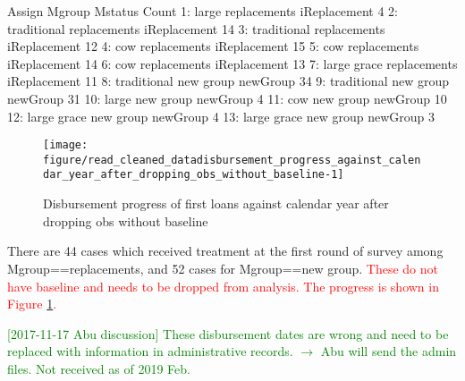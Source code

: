\begin{Schunk}
\begin{Soutput}
         Assign       Mgroup      Mstatus Count
 1:       large replacements iReplacement     4
 2: traditional replacements iReplacement    14
 3: traditional replacements iReplacement    12
 4:         cow replacements iReplacement    15
 5:         cow replacements iReplacement    14
 6:         cow replacements iReplacement    13
 7: large grace replacements iReplacement    11
 8: traditional    new group     newGroup    34
 9: traditional    new group     newGroup    31
10:       large    new group     newGroup     4
11:         cow    new group     newGroup    10
12: large grace    new group     newGroup     4
13: large grace    new group     newGroup     3
\end{Soutput}
\begin{figure}

{\centering \texttt{[image: figure/read\_cleaned\_datadisbursement\_progress\_against\_calendar\_year\_after\_dropping\_obs\_without\_baseline-1]} 

}

\caption[Disbursement progress of first loans against calendar year after dropping obs without baseline]{Disbursement progress of first loans against calendar year after dropping obs without baseline}\label{Figure disbursement progress against calendar year after dropping obs without baseline}
\end{figure}
\end{Schunk}
There are 44 cases which received treatment at the first round of survey among \textsf{Mgroup}==replacements, and 52 cases for \textsf{Mgroup}==new group. \textcolor{red}{These do not have baseline and needs to be dropped from analysis. The progress is shown in \textsf{\small Figure \ref{Figure disbursement progress against calendar year after dropping obs without baseline}}. }

\textcolor{green}{[2017-11-17 Abu discussion] These disbursement dates are wrong and need to be replaced with information in administrative records. $\rightarrow$ Abu will send the admin files. Not received as of 2019 Feb.}


